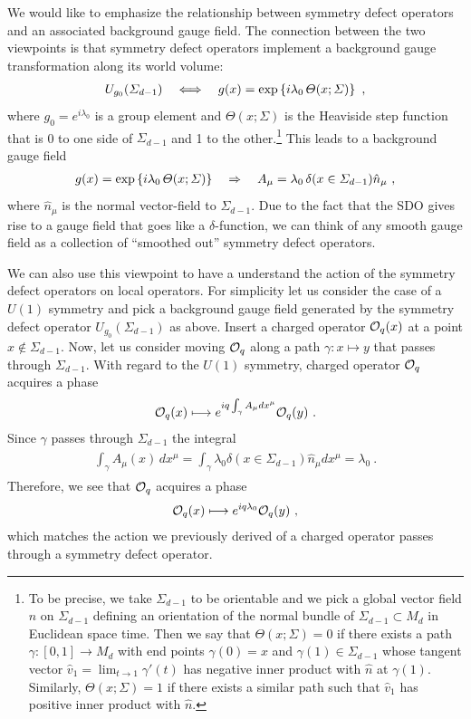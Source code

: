 \documentclass[11pt]{article}
\newcommand{\eq}[1]{\begin{align}\begin{split}#1\end{split}\end{align}}
\def\exp{{\rm exp}}
\def\CO {{\cal O}}
\def\CO {{\cal O}}
\begin{document}
We would like to emphasize the relationship between symmetry defect operators and an associated background gauge field. The connection between the two viewpoints is that symmetry defect operators implement a background gauge transformation along its world volume:
\eq{
U_{g_0}(\Sigma_{d-1})\quad\Longleftrightarrow \quad g(x)=\exp\left\{i \lambda_0 \,\Theta(x;\Sigma)\right\}~,
}
where $g_0=e^{i \lambda_0}$ is a group element and $\Theta(x;\Sigma)$ is the Heaviside step function that is 0 to one side of $\Sigma_{d-1}$ and 1 to the other.\footnote{To be precise, we take $\Sigma_{d-1}$ to be orientable and we pick a global vector field $\hat{n}$ on $\Sigma_{d-1}$ defining an orientation of the normal bundle of $\Sigma_{d-1}\subset M_d$ in Euclidean space time. Then we say that $\Theta(x;\Sigma)=0$ if there exists a path $\gamma:[0,1]\to M_d$ with end points $\gamma(0)=x$ and $\gamma(1)\in \Sigma_{d-1}$ whose tangent vector $\hat{v}_1=\lim_{t\to 1}\gamma'(t)$ has negative inner product with $\hat{n}$ at $\gamma(1)$. Similarly, $\Theta(x;\Sigma)=1$ if there exists a similar path such that $\hat{v}_1$ has positive inner product with $\hat{n}$.} This leads to a background gauge field  
\eq{\label{backgroundgaugeSDO}
g(x)=\exp\left\{i \lambda_0 \,\Theta(x;\Sigma)\right\}\quad\Rightarrow\quad A_\mu=\lambda_0 \,\delta(x\in \Sigma_{d-1})\hat{n}_\mu~,
}
where $\hat{n}_\mu$ is the normal vector-field to $\Sigma_{d-1}$. Due to the fact that the SDO gives rise to a gauge field that goes like a $\delta$-function, we can think of any smooth gauge field as a collection of ``smoothed out'' symmetry defect operators. 

We can also use this viewpoint to have a understand the action of the symmetry defect operators on local operators. For simplicity let us consider the case of a $U(1)$ symmetry and pick a background gauge field generated by the symmetry defect operator $U_{g_0}(\Sigma_{d-1})$ as above. 
 Insert a charged operator $\CO_q(x)$ at a point $x\notin \Sigma_{d-1}$. Now, let us consider moving $\CO_q$ along a path $\gamma:x\longmapsto y$ that passes through $\Sigma_{d-1}$. With regard to the $U(1)$ symmetry, charged operator $\CO_q$ acquires a phase 
\eq{
\CO_q(x)\longmapsto e^{iq \int_\gamma A_\mu dx^\mu }\CO_q(y)~.
}
Since $\gamma$ passes through $\Sigma_{d-1}$ the integral 
\eq{
\int_\gamma A_\mu(x)\,d x^\mu=\int_{\gamma}\lambda_0\delta(x\in \Sigma_{d-1})\hat{n}_\mu dx^\mu=\lambda_0~.
} 
Therefore, we see that $\CO_q$ acquires a phase 
\eq{
\CO_q(x)\longmapsto e^{iq \lambda_0}\CO_q(y)~,
}
which matches the action we previously derived of a charged operator passes through a symmetry defect operator. 
 
\end{document}
